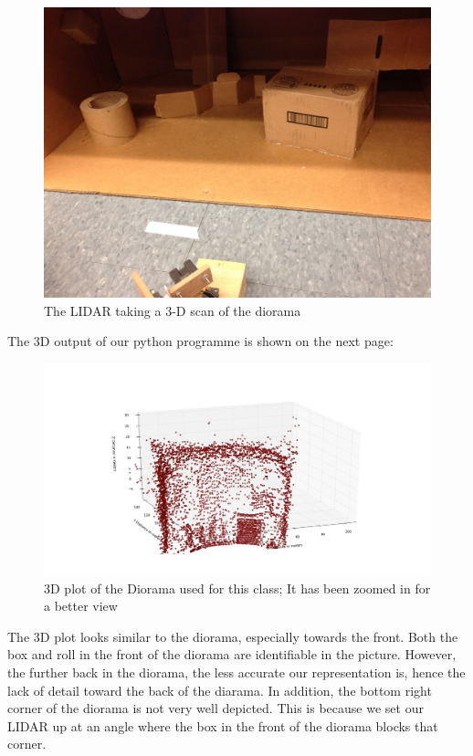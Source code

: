 \documentclass{article}
\begin{document}
\begin{figure}[h!]
\begin{center}
\includegraphics[scale=0.06]{3dscan.JPG}
\caption{The LIDAR taking a 3-D scan of the diorama}
\end{center}
\end{figure}
%
The 3D output of our python programme is shown on the next page:
%
\begin{figure}[h!]
\begin{center}
\includegraphics[scale=0.4]{3D_diarama2.png}
\caption{3D plot of the Diorama used for this class; It has been zoomed in for a better view}
\end{center}
\end{figure}

The 3D plot looks similar to the diorama, especially towards the front. Both the box and roll in the front of the diorama are identifiable in the picture. However, the further back in the diorama, the less accurate our representation is, hence the lack of detail toward the back of the diarama. In addition, the bottom right corner of the diorama is not very well depicted. This is because we set our LIDAR up at an angle where the box in the front of the diorama blocks that corner.
\end{document}
